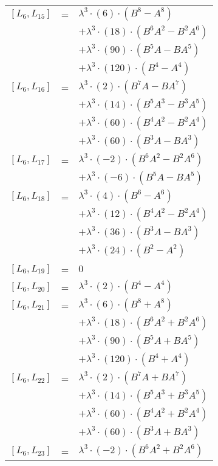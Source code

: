 \documentclass{article}
\begin{document}
\begin{center}
\begin{longtable}{lll}
$[L_{6},L_{15}]$ & = & ${\lambda}^3{\cdot}(6){\cdot}(B^{8}-A^{8})$ \\*
 & & $ + {\lambda}^3{\cdot}(18){\cdot}(B^{6}A^{2}-B^{2}A^{6})$ \\*
 & & $ + {\lambda}^3{\cdot}(90){\cdot}(B^{5}A-BA^{5})$ \\*
 & & $ + {\lambda}^3{\cdot}(120){\cdot}(B^{4}-A^{4})$ \\
$[L_{6},L_{16}]$ & = & ${\lambda}^3{\cdot}(2){\cdot}(B^{7}A-BA^{7})$ \\*
 & & $ + {\lambda}^3{\cdot}(14){\cdot}(B^{5}A^{3}-B^{3}A^{5})$ \\*
 & & $ + {\lambda}^3{\cdot}(60){\cdot}(B^{4}A^{2}-B^{2}A^{4})$ \\*
 & & $ + {\lambda}^3{\cdot}(60){\cdot}(B^{3}A-BA^{3})$ \\
$[L_{6},L_{17}]$ & = & ${\lambda}^3{\cdot}(-2){\cdot}(B^{6}A^{2}-B^{2}A^{6})$ \\*
 & & $ + {\lambda}^3{\cdot}(-6){\cdot}(B^{5}A-BA^{5})$ \\
$[L_{6},L_{18}]$ & = & ${\lambda}^3{\cdot}(4){\cdot}(B^{6}-A^{6})$ \\*
 & & $ + {\lambda}^3{\cdot}(12){\cdot}(B^{4}A^{2}-B^{2}A^{4})$ \\*
 & & $ + {\lambda}^3{\cdot}(36){\cdot}(B^{3}A-BA^{3})$ \\*
 & & $ + {\lambda}^3{\cdot}(24){\cdot}(B^{2}-A^{2})$ \\
$[L_{6},L_{19}]$ & = & $ 0 $ \\
$[L_{6},L_{20}]$ & = & ${\lambda}^3{\cdot}(2){\cdot}(B^{4}-A^{4})$ \\
$[L_{6},L_{21}]$ & = & ${\lambda}^3{\cdot}(6){\cdot}(B^{8}+A^{8})$ \\*
 & & $ + {\lambda}^3{\cdot}(18){\cdot}(B^{6}A^{2}+B^{2}A^{6})$ \\*
 & & $ + {\lambda}^3{\cdot}(90){\cdot}(B^{5}A+BA^{5})$ \\*
 & & $ + {\lambda}^3{\cdot}(120){\cdot}(B^{4}+A^{4})$ \\
$[L_{6},L_{22}]$ & = & ${\lambda}^3{\cdot}(2){\cdot}(B^{7}A+BA^{7})$ \\*
 & & $ + {\lambda}^3{\cdot}(14){\cdot}(B^{5}A^{3}+B^{3}A^{5})$ \\*
 & & $ + {\lambda}^3{\cdot}(60){\cdot}(B^{4}A^{2}+B^{2}A^{4})$ \\*
 & & $ + {\lambda}^3{\cdot}(60){\cdot}(B^{3}A+BA^{3})$ \\
$[L_{6},L_{23}]$ & = & ${\lambda}^3{\cdot}(-2){\cdot}(B^{6}A^{2}+B^{2}A^{6})$ \\*

\end{longtable}
\end{center}
\end{document}
